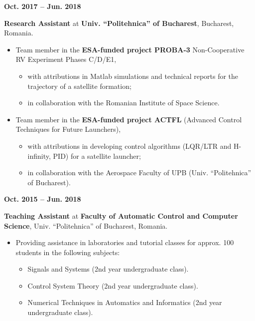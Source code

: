 \documentclass[a4paper,10pt]{article}
\newlength{\cvcolumngapwidth}
\newlength{\cvleftcolumnwidth}
\newlength{\cvrightcolumnwidth}
\newcommand{\cvtitlestyle}[1]{{\large\cvtitlefont\textcolor{cvtitlecolor}{#1}}}
\newcommand{\cvdurationstyle}[1]{{\cvdurationfont\textcolor{cvdurationcolor}{#1}}}
\newlength{\cvafteritemskipamount}
\newlength{\cvaftertitleskipamount}
\newlength{\cvparskip}
\newcommand{\cvitem}[2]{
    \begin{minipage}[t]{\cvleftcolumnwidth}
        \raggedleft #1
    \end{minipage}%
    \hspace{\cvcolumngapwidth}%
    \begin{minipage}[t]{\cvrightcolumnwidth}
        \setlength{\parskip}{\cvparskip} #2
    \end{minipage}

    \vspace{\cvafteritemskipamount}
}
\newcommand{\cvtitle}[1]{
    \cvtitlestyle{#1}

    \vspace{\cvaftertitleskipamount}
    \vspace{-\cvparskip}
}
\begin{document}
\cvitem{
    \cvdurationstyle{\textbf{Oct. 2017 -- Jun. 2018}}
}{
    \cvtitle{\textbf{Research Assistant} at \textbf{Univ. ``Politehnica'' of Bucharest}, Bucharest, Romania.}


    \begin{itemize}[leftmargin=*]
        \item Team member in the \textbf{ESA-funded project PROBA-3} Non-Cooperative RV Experiment Phases C/D/E1,
              \begin{itemize}[leftmargin=*]
                  \item with attributions in Matlab simulations and technical reports for the trajectory of a satellite formation;
                  \item in collaboration with the Romanian Institute of Space Science.
              \end{itemize}
        \item Team member in the \textbf{ESA-funded project ACTFL} (Advanced Control Techniques for Future Launchers),
              \begin{itemize}[leftmargin=*]
                  \item with attributions in developing control algorithms (LQR/LTR and H-infinity, PID) for a satellite launcher;
                  \item in collaboration with the Aerospace Faculty of UPB (Univ. ``Politehnica'' of Bucharest).
              \end{itemize}
    \end{itemize}
}

\cvitem{
    \cvdurationstyle{\textbf{Oct. 2015 -- Jun. 2018}}
}{
    \cvtitle{\textbf{Teaching Assistant} at \textbf{Faculty of Automatic Control and Computer Science}, Univ. ``Politehnica'' of Bucharest, Romania.}


    \begin{itemize}[leftmargin=*]
        \item Providing assistance in laboratories and tutorial classes for approx. 100 students in the following subjects:
              \begin{itemize}[leftmargin=*]
                  \item Signals and Systems (2nd year undergraduate class).
                  \item Control System Theory  (2nd year undergraduate class).
                  \item Numerical Techniques in Automatics and Informatics  (2nd year undergraduate class).
              \end{itemize}
    \end{itemize}
}
\end{document}
